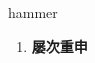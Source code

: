 
\begin{frame}
{\huge hammer}
\begin{center}
\begin{enumerate}\Large
  \item \textbf{屡次重申}
\end{enumerate}
\end{center}
\end{frame}

